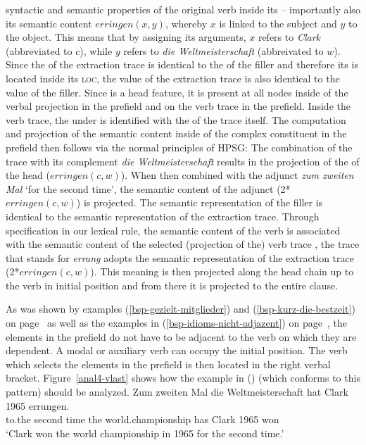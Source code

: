 syntactic and semantic properties of the original verb inside its \dslv -- importantly also its semantic content $erringen(x,y)$,
whereby $x$ is linked to the subject and $y$ to the object. This means that by assigning its arguments, $x$ refers to \emph{Clark}
(abbreviated to $c$), while $y$ refers to \emph{die Weltmeisterschaft} (abbreivated to $w$).
Since the \locv of the extraction trace is identical to the \locw of the filler and therefore its \dsl is located inside its
\textsc{loc}, the \dsl value of the extraction trace is also identical to the \dsl value of the filler. Since \dsl is a head
feature, it is present at all nodes inside of the verbal projection in the prefield and on the verb trace in the prefield. Inside the
verb trace, the \contv under \dsl is identified with the \contv of the trace itself. The computation and projection of the semantic 
content inside of the complex constituent in the prefield then follows via the normal principles of HPSG:
The combination of the trace with its complement \emph{die Weltmeisterschaft} results in the projection of the \contv of the head
($erringen(c,w)$). When then combined with the adjunct \emph{zum zweiten Mal} `for the second time', the semantic content of the adjunct (2*$erringen(c,w)$)
is projected.
The semantic representation of the filler is identical to the semantic representation of the extraction trace. Through specification in
our lexical rule, the semantic content of the verb is associated with the semantic content of the selected (projection of the) verb trace
, \ie the trace that stands for \emph{errang} adopts the semantic representation of the extraction trace (2*$erringen(c,w)$).
This meaning is then projected along the head chain up to the verb in initial position and from there it is projected to the entire clause.


As was shown by examples (\ref{bsp-gezielt-mitglieder}) and (\ref{bsp-kurz-die-bestzeit}) on page~\pageref{bsp-gezielt-mitglieder}
as well as the examples in (\ref{bsp-idioms-nicht-adjazent}) on page~\pageref{bsp-idioms-nicht-adjazent}, the elements in the prefield
do not have to be adjacent to the verb on which they are dependent. A modal or auxiliary verb can occupy the initial position. The verb which
selects the elements in the prefield is then located in the right verbal bracket.
Figure~\vref{anal4-vlast} shows how the example in () (which conforms to this pattern) should be analyzed.
\ea
\gll Zum zweiten Mal die Weltmeisterschaft hat Clark 1965 errungen.\\
	 to.the second time the world.championship has Clark 1965 won\\
\glt `Clark won the world championship in 1965 for the second time.'
\z

